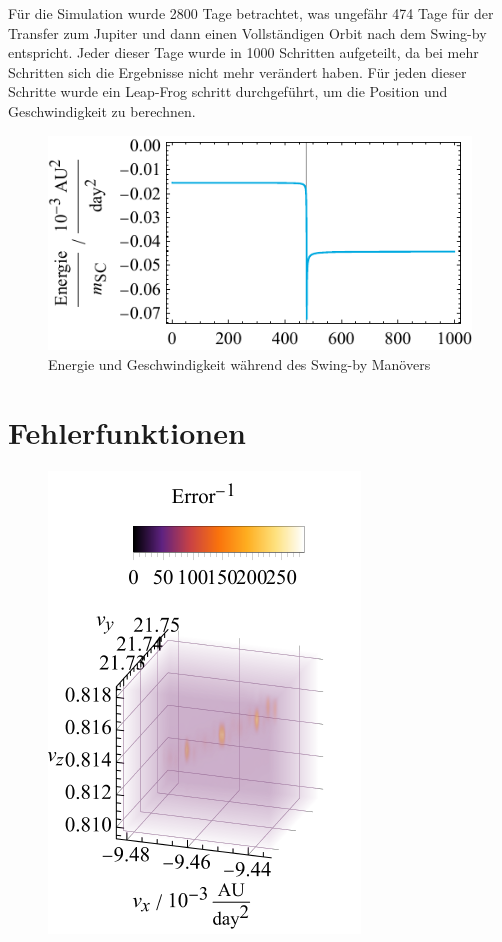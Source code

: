 Für die Simulation wurde 2800 Tage betrachtet, was ungefähr 474 Tage für der Transfer zum Jupiter und dann einen Vollständigen Orbit nach dem Swing-by entspricht.
Jeder dieser Tage wurde in 1000 Schritten aufgeteilt, da bei mehr Schritten sich die Ergebnisse nicht mehr verändert haben.
Für jeden dieser Schritte wurde ein Leap-Frog schritt durchgeführt, um die Position und Geschwindigkeit zu berechnen.


\begin{figure}[h!]
	\centering
	\includegraphics{img/energy.pdf}
	\caption{Energie und Geschwindigkeit während des Swing-by Manövers}
\end{figure}


\section{Fehlerfunktionen}
\begin{figure}[h!]
	\centering
	\includegraphics{img/gridSearch.pdf}
\end{figure}

